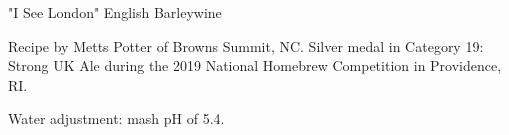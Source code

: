 \stylesection{\styleenglishbarleywine}

\begin{recipe}{"I See London" English Barleywine} %

\begin{aboutblock}
Recipe by Metts Potter of Browns Summit, NC. Silver medal in Category 19:
Strong UK Ale during the 2019 National Homebrew Competition in Providence,
RI. \sourceaha
\end{aboutblock}


\begin{methodandtiming}
 
\begin{mashsteps}
\end{mashsteps}

\begin{fermentationsteps}
\end{fermentationsteps}

\begin{directions}
Water adjustment: mash pH of 5.4.
\end{directions}

\end{methodandtiming}

\recipebreak

\begin{ingredientsblock}

\begin{malts}
\end{malts}

\begin{hops}
\end{hops}


\end{ingredientsblock}

\end{recipe}

